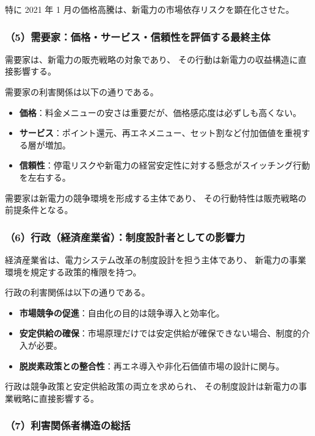 特に 2021 年 1 月の価格高騰は、新電力の市場依存リスクを顕在化させた。

\subsubsection{（5）需要家：価格・サービス・信頼性を評価する最終主体}

需要家は、新電力の販売戦略の対象であり、
その行動は新電力の収益構造に直接影響する。

需要家の利害関係は以下の通りである。

\begin{itemize}
  \item \textbf{価格}：料金メニューの安さは重要だが、価格感応度は必ずしも高くない。
  \item \textbf{サービス}：ポイント還元、再エネメニュー、セット割など付加価値を重視する層が増加。
  \item \textbf{信頼性}：停電リスクや新電力の経営安定性に対する懸念がスイッチング行動を左右する。
\end{itemize}

需要家は新電力の競争環境を形成する主体であり、
その行動特性は販売戦略の前提条件となる。

\subsubsection{（6）行政（経済産業省）：制度設計者としての影響力}

経済産業省は、電力システム改革の制度設計を担う主体であり、
新電力の事業環境を規定する政策的権限を持つ。

行政の利害関係は以下の通りである。

\begin{itemize}
  \item \textbf{市場競争の促進}：自由化の目的は競争導入と効率化。
  \item \textbf{安定供給の確保}：市場原理だけでは安定供給が確保できない場合、制度的介入が必要。
  \item \textbf{脱炭素政策との整合性}：再エネ導入や非化石価値市場の設計に関与。
\end{itemize}

行政は競争政策と安定供給政策の両立を求められ、
その制度設計は新電力の事業戦略に直接影響する。

\subsubsection{（7）利害関係者構造の総括}

